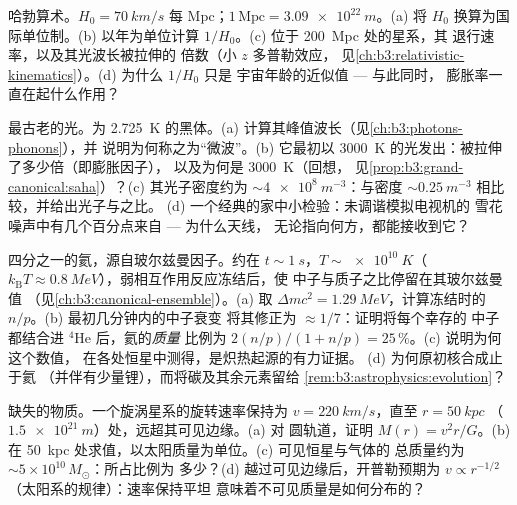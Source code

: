 \begin{exercise}[$\star\star\star$]\label{exo:b3:astrophysics:9}
哈勃算术。$H_0 = \qty{70}{km/s}$ 每 Mpc；$1\,
\text{Mpc} = \qty{3.09e22}{m}$。(a) 将 $H_0$ 换算为国际单位制。(b)
以年为单位计算 $1/H_0$。(c) 位于 \qty{200}{Mpc} 处的星系，其
退行速率，以及其光波长被拉伸的
倍数（小 $z$ 多普勒效应，
见\cref{ch:b3:relativistic-kinematics}）。(d) 为什么 $1/H_0$ 只是
宇宙年龄的近似值 --- 与此同时，
膨胀率一直在起什么作用？
\end{exercise}

\begin{exercise}[$\star\star\star$]\label{exo:b3:astrophysics:10}
最古老的光。为 \qty{2.725}{K} 的黑体。(a)
计算其峰值波长（见\cref{ch:b3:photons-phonons}），并
说明为何称之为“微波”。(b) 它最初以
\qty{3000}{K} 的光发出：被拉伸了多少倍（即膨胀因子），
以及为何是 \qty{3000}{K}（回想，
见\cref{prop:b3:grand-canonical:saha}）？(c) 其光子密度约为
$\sim\qty{4e8}{m^{-3}}$：与密度
$\sim\qty{0.25}{m^{-3}}$ 相比较，并给出光子与之比。
(d) 一个经典的家中小检验：未调谐模拟电视机的
雪花噪声中有几个百分点来自 --- 为什么天线，
无论指向何方，都能接收到它？
\end{exercise}

\begin{exercise}[$\star\star\star$]\label{exo:b3:astrophysics:11}
四分之一的氦，源自玻尔兹曼因子。约在 $t \sim
\qty{1}{s}$，$T \sim \qty{e10}{K}$（$k_{\text{B}}T \approx
\qty{0.8}{MeV}$），弱相互作用反应冻结后，使
中子与质子之比停留在其玻尔兹曼值
（见\cref{ch:b3:canonical-ensemble}）。(a) 取 $\Delta mc^2 =
\qty{1.29}{MeV}$，计算冻结时的 $n/p$。(b) 最初几分钟内的中子衰变
将其修正为 $\approx1/7$：证明将每个幸存的
中子都结合进 $^4$He 后，氦的\emph{质量}
比例为 $2(n/p)/(1 + n/p) = 25\,\%$。(c) 说明为何这个数值，
在各处恒星中测得，是炽热起源的有力证据。
(d) 为何原初核合成止于氦
（并伴有少量锂），而将碳及其余元素留给
\cref{rem:b3:astrophysics:evolution}？
\end{exercise}

\begin{exercise}[$\star\star\star$]\label{exo:b3:astrophysics:12}
缺失的物质。一个旋涡星系的旋转速率保持为
$v = \qty{220}{km/s}$，直至 $r = \qty{50}{kpc}$
（$\qty{1.5e21}{m}$）处，远超其可见边缘。(a) 对
圆轨道，证明 $M(r) = v^2r/G$。(b) 在
\qty{50}{kpc} 处求值，以太阳质量为单位。(c) 可见恒星与气体的
总质量约为 $\sim5\times10^{10}\,M_\odot$：所占比例为
多少？(d) 越过可见边缘后，开普勒预期为
$v \propto r^{-1/2}$（太阳系的规律）：速率保持平坦
意味着不可见质量是如何分布的？
\end{exercise}

